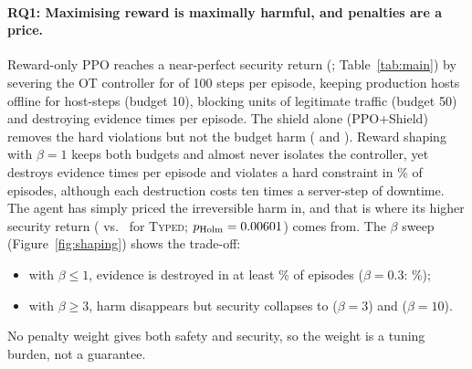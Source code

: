 \documentclass[10pt]{article}
\newcommand{\typed}{\textsc{Typed}}
\begin{document}
\paragraph{RQ1: Maximising reward is maximally harmful, and penalties are a price.}
Reward-only PPO reaches a near-perfect security return
(\resTrainPpoR; Table~\ref{tab:main}) by severing the OT controller for
\resTrainPpoCrit{} of 100 steps per episode, keeping production hosts offline
for \resTrainPpoProd{} host-steps (budget 10), blocking \resTrainPpoTraf{}
units of legitimate traffic (budget 50) and destroying evidence
\resTrainPpoEvid{} times per episode. The shield alone (PPO+Shield) removes
the hard violations but not the budget harm (\resTrainShieldProd{} and
\resTrainShieldTraf). Reward shaping with $\beta=1$ keeps both budgets and
almost never isolates the controller, yet destroys evidence
\resTrainShapedEvid{} times per episode and violates a hard constraint in
\resTrainShapedHardFreePctViol\% of episodes, although each destruction costs
ten times a server-step of downtime. The agent has simply priced the
irreversible harm in, and that is where its higher security return
(\resTrainShapedR{} vs.\ \resTrainTypedR{} for \typed;
$p_{\text{Holm}}=0.00601$) comes from. The $\beta$ sweep
(Figure~\ref{fig:shaping}) shows the trade-off:
\begin{itemize}
\item with $\beta\le 1$, evidence is destroyed in at least
\resTrainShapedHardFreePctViol\% of episodes ($\beta=0.3$:
\resTrainShapedThreeTenthsHardFreePctViol\%);
\item with $\beta\ge 3$, harm disappears but security collapses to
\resTrainShapedThreeR{} ($\beta=3$) and \resTrainShapedTenR{} ($\beta=10$).
\end{itemize}
No penalty weight gives both safety and security, so the weight is a tuning
burden, not a guarantee.
\end{document}
